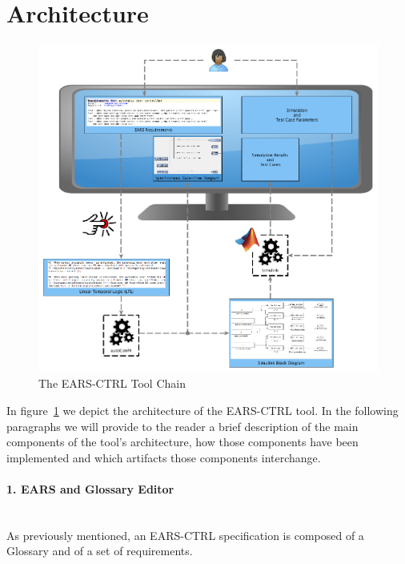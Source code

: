 \section{Architecture}

\begin{figure}[t]
   \begin{center}
     \includegraphics[width=1\textwidth]{images/toolchain.png}
     \caption{The \textsf{EARS-CTRL} Tool Chain}
     \label{fig:ears_ctrl_toolchain}
   \end{center}
 \end{figure}
 
In figure~\ref{fig:ears_ctrl_toolchain} we depict the architecture of the
\textsf{EARS-CTRL} tool. In the following paragraphs we will provide to the
reader a brief description of the main components of the tool's architecture,
how those components have been implemented and which artifacts those
components interchange. 
 
\paragraph{1. EARS and Glossary Editor\\\\} 

As previously mentioned, an \textsf{EARS-CTRL} specification is composed of a
Glossary and of a set of requirements.

